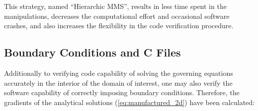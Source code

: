 \documentclass[10pt]{article}
\begin{document}
This strategy, named ``Hierarchic MMS'', results in less time spent in the manipulations, decreases the computational effort and occasional software crashes, and also increases the flexibility in the code verification procedure.



\subsection{Boundary Conditions and C Files}
Additionally to verifying code capability of solving the governing equations accurately in the interior of the domain of interest, one may also verify the software capability of correctly imposing boundary conditions. Therefore, the gradients of the  analytical solutions (\ref{eq:manufactured_2d}) have been calculated:
\end{document}
